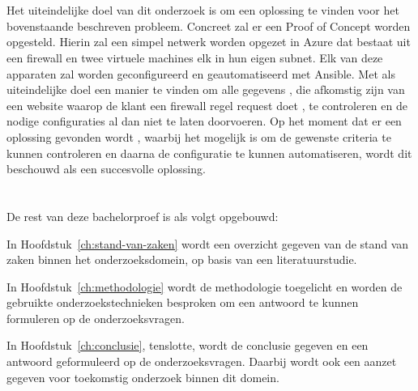 \section{}%
\label{sec:onderzoeksdoelstelling}
Het uiteindelijke doel van dit onderzoek is om een oplossing te vinden voor het bovenstaande beschreven probleem. Concreet zal er een Proof of Concept worden opgesteld. Hierin zal een simpel netwerk worden opgezet in Azure dat bestaat uit een firewall en twee virtuele machines elk in hun eigen subnet. Elk van deze apparaten zal worden geconfigureerd en geautomatiseerd met Ansible. Met als uiteindelijke doel een manier te vinden om alle gegevens , die afkomstig zijn van een website waarop de klant een firewall regel request doet , te controleren en de nodige configuraties al dan niet te laten doorvoeren. Op het moment dat er een oplossing gevonden wordt , waarbij het mogelijk is om de gewenste criteria te kunnen controleren en daarna de configuratie te kunnen automatiseren, wordt dit beschouwd als een succesvolle oplossing. 

\section{}%
\label{sec:opzet-bachelorproef-TODO}


De rest van deze bachelorproef is als volgt opgebouwd:

In Hoofdstuk~\ref{ch:stand-van-zaken} wordt een overzicht gegeven van de stand van zaken binnen het onderzoeksdomein, op basis van een literatuurstudie.

In Hoofdstuk~\ref{ch:methodologie} wordt de methodologie toegelicht en worden de gebruikte onderzoekstechnieken besproken om een antwoord te kunnen formuleren op de onderzoeksvragen.


In Hoofdstuk~\ref{ch:conclusie}, tenslotte, wordt de conclusie gegeven en een antwoord geformuleerd op de onderzoeksvragen. Daarbij wordt ook een aanzet gegeven voor toekomstig onderzoek binnen dit domein.